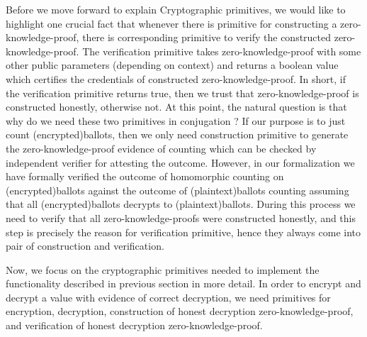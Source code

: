 \documentclass{llncs}
\begin{document}
Before we move forward to explain Cryptographic primitives,
we would like to highlight one crucial fact that  whenever 
there is primitive for constructing a zero-knowledge-proof, 
there is corresponding primitive to verify the constructed 
zero-knowledge-proof.
The verification primitive takes zero-knowledge-proof with some 
other public parameters (depending on context) 
and returns a boolean value which certifies the credentials of constructed 
zero-knowledge-proof. In short, if the verification primitive returns 
true, then we trust that zero-knowledge-proof is constructed honestly, 
otherwise not. At this point, the natural question is that
why do we need these two primitives in conjugation ? If our purpose 
is to just count (encrypted)ballots, then we only need 
construction primitive
to generate the zero-knowledge-proof evidence of counting which can be
checked by independent verifier for attesting the outcome.
However, in our formalization we have formally 
verified the outcome of homomorphic counting 
on (encrypted)ballots against the outcome of (plaintext)ballots
counting\cite{Pattinson:2017:SVE} assuming that all (encrypted)ballots 
decrypts to (plaintext)ballots. During this process we need to verify that 
all zero-knowledge-proofs were constructed honestly, and this step 
is precisely the reason for verification primitive, hence they 
always come into pair of construction and verification.
%

   
Now, we focus on the  cryptographic primitives needed to implement 
the functionality described in previous section in more detail. 
In order to encrypt and decrypt a value with 
evidence of correct decryption, we need primitives for encryption, 
decryption, construction of
honest decryption zero-knowledge-proof, and verification of 
honest decryption zero-knowledge-proof.
%
\end{document}
